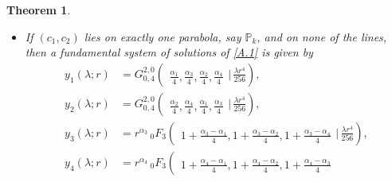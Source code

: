 \documentclass[reqno,11pt,centertags]{amsart}
\newcommand{\<}{\langle}
\renewcommand{\>}{\rangle}
\numberwithin{equation}{section}
\newtheorem{theorem}{Theorem}[section]
\theoremstyle{definition}
\def\d{\displaystyle}
\begin{document}
\begin{theorem}
\begin{itemize}
\begin{align}
\begin{array}{c}
\end{array} \bigg\vert\,   \frac{\lambda r^4}{256} \right),\\
y_3(\lambda;r)&=r^{\alpha_3} \,_{0} F_3\left(\!\begin{array}{c}\\
{ 1+\frac{\alpha_4-\alpha_1}{4}, 1+\frac{\alpha_4-\alpha_2}{4}, 1+\frac{\alpha_4-\alpha_3}{4}}
\end{array} \bigg\vert\,  \frac{\lambda r^4}{256} \right),\\
\quad y_4(\lambda;r)&=r^{\alpha_4} \,_{0} F_3\left(\!\begin{array}{c}\\
{ 1+\frac{\alpha_3-\alpha_1}{4}, 1+\frac{\alpha_3-\alpha_2}{4}, 1+\frac{\alpha_3-\alpha_4}{4}}
\end{array} \bigg\vert\,  \frac{\lambda r^4}{256} \right),  
\end{align}
if $\d c_1<\frac{5}{4}- 4k^2$.  \\[1mm] 
\item[(b)]
If $(c_1,c_2)$ lies on exactly one parabola, say $\mathbb{P}_k$, and on none of the lines, then a fundamental system of solutions of \eqref{A.1} is given by 
\begin{align}
y_1(\lambda;r)&=G_{0,4}^{2,0}\left(\!\begin{array}{c}\\
{\frac{\alpha_1}{4},\frac{\alpha_3}{4}, \frac{\alpha_2}{4},\frac{\alpha_4}{4}}
\end{array} \bigg\vert\,   \frac{\lambda r^4}{256} \right),\\
y_2(\lambda;r)&=G_{0,4}^{2,0}\left(\!\begin{array}{c}\\
{\frac{\alpha_2}{4},\frac{\alpha_4}{4}, \frac{\alpha_1}{4},\frac{\alpha_3}{4}}
\end{array} \bigg\vert\,   \frac{\lambda r^4}{256} \right),\\
y_3(\lambda;r)&=r^{\alpha_3} \,_{0} F_3\left(\!\begin{array}{c}\\
{ 1+\frac{\alpha_3-\alpha_1}{4}, 1+\frac{\alpha_3-\alpha_2}{4}, 1+\frac{\alpha_3-\alpha_4}{4}}
\end{array} \bigg\vert\,  \frac{\lambda r^4}{256} \right),\\
y_4(\lambda;r)&=r^{\alpha_4} \,_{0} F_3\left(\!\begin{array}{c}\\
{ 1+\frac{\alpha_4-\alpha_1}{4}, 1+\frac{\alpha_4-\alpha_2}{4}, 1+\frac{\alpha_4-\alpha_3}{4}}

\end{array}
\end{align}
\end{itemize}
\end{theorem}
\end{document}
